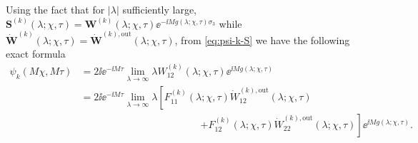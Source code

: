 Using the fact that for $|\lambda|$ sufficiently large, 
$\mathbf{S}^{(k)}(\lambda;\chi,\tau)=\mathbf{W}^{(k)}(\lambda;\chi,\tau)\ee^{-\ii Mg(\lambda;\chi,\tau)\sigma_3}$ while $\dot{\mathbf{W}}^{(k)}(\lambda;\chi,\tau)=\dot{\mathbf{W}}^{(k),\mathrm{out}}(\lambda;\chi,\tau)$,
from \eqref{eq:psi-k-S} we have the following exact formula
\begin{equation}
\begin{split}
\psi_k(M\chi,M\tau)&=2\ii\ee^{-\ii M\tau}\lim_{\lambda\to\infty}\lambda W^{(k)}_{12}(\lambda;\chi,\tau)\ee^{\ii Mg(\lambda;\chi,\tau)}\\
&=2\ii\ee^{-\ii M\tau}\lim_{\lambda\to\infty}\lambda\left[F^{(k)}_{11}(\lambda;\chi,\tau)\dot{W}^{(k),\mathrm{out}}_{12}(\lambda;\chi,\tau)\right.\\
&\qquad\qquad\qquad\qquad\qquad\qquad{}\left.+F^{(k)}_{12}(\lambda;\chi,\tau)\dot{W}^{(k),\mathrm{out}}_{22}(\lambda;\chi,\tau)\right]\ee^{\ii Mg(\lambda;\chi,\tau)}.
\end{split}
\end{equation}
